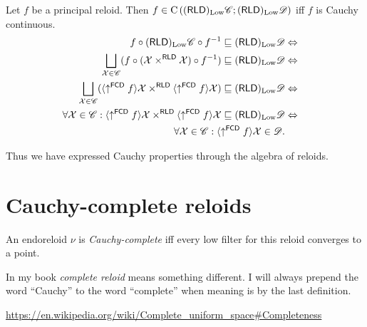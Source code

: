 \begin{prop}
  Let $f$ be a principal reloid. Then $f \in \mathrm{C} \left( 
  (\mathsf{RLD})_{\operatorname{Low}} \mathscr{C} ;
  (\mathsf{RLD})_{\operatorname{Low}} \mathscr{D} \right)$ iff $f$ is Cauchy
  continuous.
  \begin{eqnarray*}
    f \circ (\mathsf{RLD})_{\Low} \mathscr{C} \circ f^{- 1}
    \sqsubseteq (\mathsf{RLD})_{\Low} \mathscr{D} &
    \Leftrightarrow & \\
    \bigsqcup_{\mathcal{X} \in
    \mathscr{C}} (f \circ (\mathcal{X} \times^{\mathsf{RLD}}
    \mathcal{X} ) \circ f^{- 1} ) \sqsubseteq (\mathsf{RLD})_{\Low}
    \mathscr{D} & \Leftrightarrow & \\
    \bigsqcup_{\mathcal{X} \in \mathscr{C}} ( \langle \uparrow^{\mathsf{FCD}} f \rangle
    \mathcal{X} \times^{\mathsf{RLD}} \langle
    \uparrow^{\mathsf{FCD}} f \rangle \mathcal{X}) \sqsubseteq
    (\mathsf{RLD})_{\Low} \mathscr{D} & \Leftrightarrow & \\
    \forall \mathcal{X} \in \mathscr{C} : \langle
    \uparrow^{\mathsf{FCD}} f \rangle \mathcal{X}
    \times^{\mathsf{RLD}} \langle \uparrow^{\mathsf{FCD}} f
    \rangle \mathcal{X} \sqsubseteq (\mathsf{RLD})_{\Low}
    \mathscr{D} & \Leftrightarrow & \\
    \forall \mathcal{X} \in \mathscr{C} : \langle
    \uparrow^{\mathsf{FCD}} f \rangle \mathcal{X} \in \mathscr{D} . & 
    & 
  \end{eqnarray*}
\end{prop}

Thus we have expressed Cauchy properties through the algebra of reloids.

\section{Cauchy-complete reloids}

\begin{defn}
  An endoreloid $\nu$ is \emph{Cauchy-complete} iff every low filter for
  this reloid converges to a point.
\end{defn}

\begin{rem}
  In my book \cite{volume-1} \emph{complete reloid} means something
  different. I will always prepend the word ``Cauchy'' to the word
  ``complete'' when meaning is by the last definition.
\end{rem}

\url{https://en.wikipedia.org/wiki/Complete\_uniform\_space\#Completeness}

